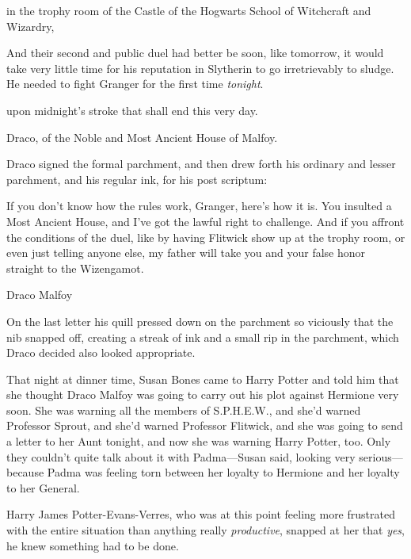 \begin{writtenNote}
in the trophy room of the Castle of the Hogwarts School of Witchcraft and Wizardry,
\end{writtenNote}

And their second and public duel had better be soon, like tomorrow, it would take very little time for his reputation in Slytherin to go irretrievably to sludge. He needed to fight Granger for the first time \emph{tonight}.

\begin{writtenNote}
upon midnight's stroke that shall end this very day.

Draco, of the Noble and Most Ancient House of Malfoy.
\end{writtenNote}

Draco signed the formal parchment, and then drew forth his ordinary and lesser parchment, and his regular ink, for his post scriptum:

\begin{writtenNote}
If you don't know how the rules work, Granger, here's how it is. You insulted a Most Ancient House, and I've got the lawful right to challenge. And if you affront the conditions of the duel, like by having Flitwick show up at the trophy room, or even just telling anyone else, my father will take you and your false honor straight to the Wizengamot.

Draco Malfoy
\end{writtenNote}

On the last letter his quill pressed down on the parchment so viciously that the nib snapped off, creating a streak of ink and a small rip in the parchment, which Draco decided also looked appropriate.

\later

That night at dinner time, Susan Bones came to Harry Potter and told him that she thought Draco Malfoy was going to carry out his plot against Hermione very soon. She was warning all the members of S.P.H.E.W., and she'd warned Professor Sprout, and she'd warned Professor Flitwick, and she was going to send a letter to her Aunt tonight, and now she was warning Harry Potter, too. Only they couldn't quite talk about it with Padma—Susan said, looking very serious—because Padma was feeling torn between her loyalty to Hermione and her loyalty to her General.

Harry James Potter-Evans-Verres, who was at this point feeling more frustrated with the entire situation than anything really \emph{productive}, snapped at her that \emph{yes}, he knew something had to be done.

